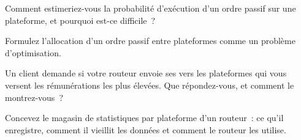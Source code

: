 \begin{interviewq}\label{iq:mx:smart-order-routing:3}
Comment estimeriez-vous la probabilité d'exécution d'un ordre passif sur une plateforme, et pourquoi est-ce difficile~?
\end{interviewq}

\begin{interviewq}\label{iq:mx:smart-order-routing:4}
Formulez l'allocation d'un ordre passif entre plateformes comme un problème d'optimisation.
\end{interviewq}

\begin{interviewq}\label{iq:mx:smart-order-routing:5}
Un client demande si votre routeur envoie ses  vers les plateformes qui vous versent les rémunérations les plus élevées. Que répondez-vous, et comment le montrez-vous~?
\end{interviewq}

\begin{interviewq}\label{iq:mx:smart-order-routing:6}
Concevez le magasin de statistiques par plateforme d'un routeur~: ce qu'il enregistre, comment il vieillit les données et comment le routeur les utilise.
\end{interviewq}
